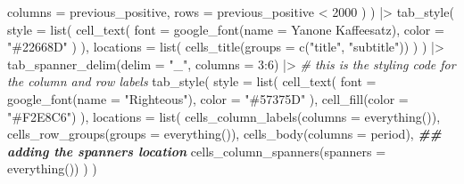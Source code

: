 \documentclass[
]{article}
\newenvironment{Shaded}{\begin{snugshade}}{\end{snugshade}}
\newcommand{\AttributeTok}[1]{\textcolor[rgb]{0.77,0.63,0.00}{#1}}
\newcommand{\CommentTok}[1]{\textcolor[rgb]{0.56,0.35,0.01}{\textit{#1}}}
\newcommand{\DecValTok}[1]{\textcolor[rgb]{0.00,0.00,0.81}{#1}}
\newcommand{\DocumentationTok}[1]{\textcolor[rgb]{0.56,0.35,0.01}{\textbf{\textit{#1}}}}
\newcommand{\FunctionTok}[1]{\textcolor[rgb]{0.00,0.00,0.00}{#1}}
\newcommand{\NormalTok}[1]{#1}
\newcommand{\SpecialCharTok}[1]{\textcolor[rgb]{0.00,0.00,0.00}{#1}}
\newcommand{\StringTok}[1]{\textcolor[rgb]{0.31,0.60,0.02}{#1}}
\begin{document}
\begin{Shaded}
\begin{Highlighting}[]
      \AttributeTok{columns =}\NormalTok{ previous\_positive,}
      \AttributeTok{rows =}\NormalTok{ previous\_positive }\SpecialCharTok{\textless{}} \DecValTok{2000}
\NormalTok{    )}
\NormalTok{  ) }\SpecialCharTok{|\textgreater{}} 
  \FunctionTok{tab\_style}\NormalTok{(}
      \AttributeTok{style =} \FunctionTok{list}\NormalTok{(}
        \FunctionTok{cell\_text}\NormalTok{(}
          \AttributeTok{font =} \FunctionTok{google\_font}\NormalTok{(}\AttributeTok{name =} \StringTok{\textquotesingle{}Yanone Kaffeesatz\textquotesingle{}}\NormalTok{), }
          \AttributeTok{color =} \StringTok{"\#22668D"}
\NormalTok{        )}
\NormalTok{      ),}
      \AttributeTok{locations =} \FunctionTok{list}\NormalTok{(}
        \FunctionTok{cells\_title}\NormalTok{(}\AttributeTok{groups =} \FunctionTok{c}\NormalTok{(}\StringTok{"title"}\NormalTok{, }\StringTok{"subtitle"}\NormalTok{))}
\NormalTok{      )}
\NormalTok{  ) }\SpecialCharTok{|\textgreater{}} 
  \FunctionTok{tab\_spanner\_delim}\NormalTok{(}\AttributeTok{delim =} \StringTok{"\_"}\NormalTok{, }\AttributeTok{columns =} \DecValTok{3}\SpecialCharTok{:}\DecValTok{6}\NormalTok{) }\SpecialCharTok{|\textgreater{}} 
  \CommentTok{\# this is the styling code for the column and row labels}
  \FunctionTok{tab\_style}\NormalTok{(}
    \AttributeTok{style =} \FunctionTok{list}\NormalTok{(}
      \FunctionTok{cell\_text}\NormalTok{(}
        \AttributeTok{font =} \FunctionTok{google\_font}\NormalTok{(}\AttributeTok{name =} \StringTok{"Righteous"}\NormalTok{),}
        \AttributeTok{color =} \StringTok{"\#57375D"}
\NormalTok{      ),}
      \FunctionTok{cell\_fill}\NormalTok{(}\AttributeTok{color =} \StringTok{"\#F2E8C6"}\NormalTok{)}
\NormalTok{    ),}
    \AttributeTok{locations =} \FunctionTok{list}\NormalTok{(}
      \FunctionTok{cells\_column\_labels}\NormalTok{(}\AttributeTok{columns =} \FunctionTok{everything}\NormalTok{()),}
      \FunctionTok{cells\_row\_groups}\NormalTok{(}\AttributeTok{groups =} \FunctionTok{everything}\NormalTok{()),}
      \FunctionTok{cells\_body}\NormalTok{(}\AttributeTok{columns =}\NormalTok{ period),}
      \DocumentationTok{\#\# adding the spanners location}
      \FunctionTok{cells\_column\_spanners}\NormalTok{(}\AttributeTok{spanners =} \FunctionTok{everything}\NormalTok{())}
\NormalTok{    )}
\NormalTok{  ) }
\end{Highlighting}
\end{Shaded}
\end{document}
